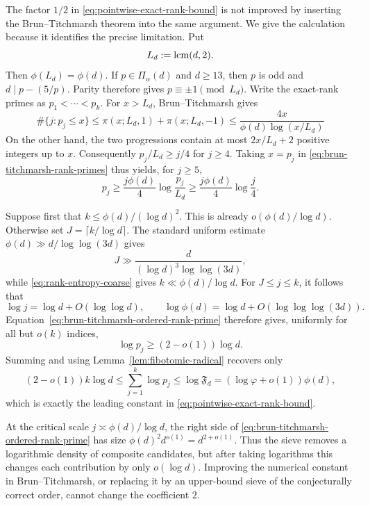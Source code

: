 \begin{remark}
\label{rem:sieve-barrier}
The factor $1/2$ in \eqref{eq:pointwise-exact-rank-bound} is not improved
by inserting the Brun--Titchmarsh theorem into the same argument.  We give
the calculation because it identifies the precise limitation.  Put
\[
 L_d:=\mathop{\rm lcm}(d,2).
\]
Then $\phi(L_d)=\phi(d)$.  If $p\in\Pi_\alpha(d)$ and $d\geq13$, then $p$
is odd and $d\mid p-(5/p)$.  Parity therefore gives
$p\equiv\pm1\pmod {L_d}$.  Write the exact-rank primes as
$p_1<\cdots<p_k$.  For $x>L_d$, Brun--Titchmarsh
\cite{MontgomeryVaughan1973LargeSieve} gives
\begin{equation}
\label{eq:brun-titchmarsh-rank-primes}
 \#\{j:p_j\leq x\}
 \leq \pi(x;L_d,1)+\pi(x;L_d,-1)
 \leq \frac{4x}{\phi(d)\log(x/L_d)}
\end{equation}
On the other hand, the two
progressions contain at most $2x/L_d+2$ positive integers up to $x$.
Consequently $p_j/L_d\geq j/4$ for $j\geq4$.  Taking $x=p_j$ in
\eqref{eq:brun-titchmarsh-rank-primes} thus yields, for $j\geq5$,
\begin{equation}
\label{eq:brun-titchmarsh-ordered-rank-prime}
 p_j\geq \frac{j\phi(d)}4\log\frac{p_j}{L_d}
 \geq \frac{j\phi(d)}4\log\frac j4.
\end{equation}

Suppose first that $k\leq\phi(d)/(\log d)^2$.  This is already
$o(\phi(d)/\log d)$.  Otherwise set
$J=\lceil k/\log d\rceil$.  The standard uniform estimate
$\phi(d)\gg d/\log\log(3d)$ gives
\[
 J\gg \frac{d}{(\log d)^3\log\log(3d)},
\]
while \eqref{eq:rank-entropy-coarse} gives $k\ll\phi(d)/\log d$.
For $J\leq j\leq k$, it follows that
\[
 \log j=\log d+O(\log\log d),
 \qquad
 \log\phi(d)=\log d+O(\log\log\log(3d)).
\]
Equation~\eqref{eq:brun-titchmarsh-ordered-rank-prime} therefore gives,
uniformly for all but $o(k)$ indices,
\[
 \log p_j\geq(2-o(1))\log d.
\]
Summing and using Lemma~\ref{lem:fibotomic-radical} recovers only
\[
 (2-o(1))k\log d
 \leq\sum_{j=1}^k\log p_j
 \leq\log\mathfrak F_d
 =(\log\varphi+o(1))\phi(d),
\]
which is exactly the leading constant in
\eqref{eq:pointwise-exact-rank-bound}.

At the critical scale $j\asymp\phi(d)/\log d$, the right side of
\eqref{eq:brun-titchmarsh-ordered-rank-prime} has size
$\phi(d)^2d^{o(1)}=d^{2+o(1)}$.  Thus the sieve removes a logarithmic
density of composite candidates, but after taking logarithms this changes
each contribution by only $o(\log d)$.  Improving the numerical constant
in Brun--Titchmarsh, or replacing it by an upper-bound sieve of the
conjecturally correct order, cannot change the coefficient $2$.


\end{remark}
